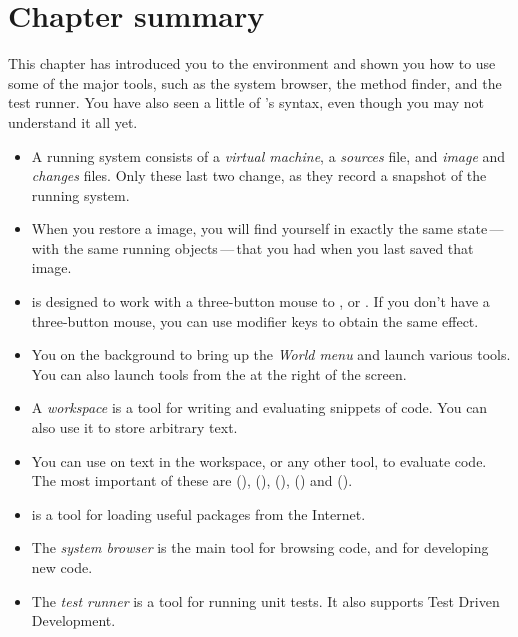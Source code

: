 \documentclass[a4paper,10pt,twoside]{book}
\begin{document}
\section{Chapter summary}
This chapter has introduced you to the \pharo environment and shown you how to use some of the major tools, such as the system browser, the method finder, and the test runner.   You have also seen a little of \pharo's syntax, even though you may not understand it all yet.

\begin{itemize}
  \item A running \pharo system consists of a \emph{virtual machine}, a \emph{sources} file, and \emph{image} and \emph{changes} files. Only these last two change, as they record a snapshot of the running system.
  \item When you restore a \pharo image, you will find yourself in exactly the same state\,---\,with the same running objects\,---\,that you had when you last saved that image.
  \item \pharo is designed to work with a three-button mouse to \click, \actclick or \metaclick.  If you don't have a three-button mouse, you can use modifier keys to obtain the same effect.
  \item You \click on the \pharo background to bring up the \emph{World menu} and launch various tools. You can also launch tools from the \toolsflapind at the right of the \pharo screen.
  \item A \emph{workspace} is a tool for writing and evaluating snippets of code. You can also use it to store arbitrary text.
  \item You can use  on text in the workspace, or any other tool, to evaluate code. The most important of these are  (),  (),  (),  () and  ().
  \item \sqmap is a tool for loading useful packages from the Internet.
  \item The \emph{system browser} is the main tool for browsing \pharo code, and for developing new code.
  \item The \emph{test runner} is a tool for running unit tests. It also supports Test Driven Development.
\end{itemize}

\ifx\wholebook\relax\else 
   
   
\end{document}
